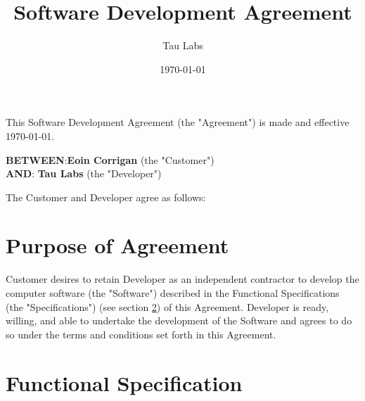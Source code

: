 \documentclass[11pt]{article}
\begin{document}
\title{Software Development Agreement}
\author{Tau Labs}
\date{\today}
\maketitle
\section*{}
This Software Development Agreement (the "Agreement") is made and effective {\today}.
\begin{tabbing}
{\bf BETWEEN}:\hspace{0.2in}\={\bf Eoin Corrigan} (the "Customer") \\
{\bf AND}:\> {\bf Tau Labs } (the "Developer") 
\end{tabbing}
The Customer and Developer agree as follows:
\section{Purpose of Agreement}
Customer desires to retain Developer as an independent contractor to develop the computer software (the "Software") described in the Functional Specifications (the "Specifications") (see section \ref{sec:functional_spec}) of this Agreement. Developer is ready, willing, and able to undertake the development of the Software and agrees to do so under the terms and conditions set forth in this Agreement.
\section{Functional Specification}
\label{sec:functional_spec}
\end{document}
